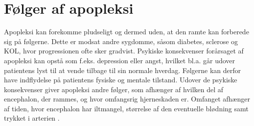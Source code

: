 \section{Følger af apopleksi }
Apopleksi kan forekomme pludseligt og dermed uden, at den ramte kan forberede sig på følgerne. Dette er modsat andre sygdomme, såsom diabetes, sclerose og KOL, hvor progressionen ofte sker gradvist. Psykiske konsekvenser forårsaget af apopleksi kan opstå som f.eks. depression eller angst, hvilket bl.a. går udover patientens lyst til at vende tilbage til sin normale hverdag. Følgerne kan derfor have indflydelse på patientens fysiske og mentale tilstand. \cite{Muus2008} Udover de psykiske konsekvenser giver apopleksi andre følger, som afhænger af hvilken del af encephalon, der rammes, og hvor omfangsrig hjerneskaden er. Omfanget afhænger af tiden, hvor encephalon har iltmangel, størrelse af den eventuelle blødning samt trykket i arterien \cite{Michael-Titus2010}. 

